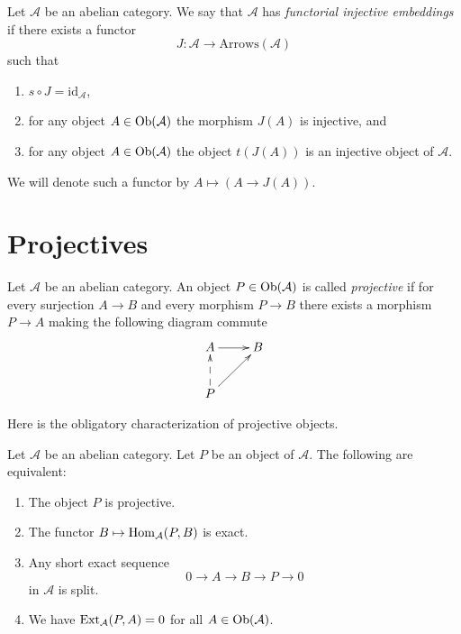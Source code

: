 \begin{definition}
\label{definition-functorial-injective-embedding}
Let $\mathcal{A}$ be an abelian category.
We say that $\mathcal{A}$ has {\it functorial injective embeddings}
if there exists a functor
$$
J : \mathcal{A} \longrightarrow \text{Arrows}(\mathcal{A})
$$
such that
\begin{enumerate}
\item $s \circ J = \text{id}_\mathcal{A}$,
\item for any object $A \in \mathop{\mathrm{Ob}}\nolimits(\mathcal{A})$
the morphism $J(A)$ is injective, and
\item for any object $A \in \mathop{\mathrm{Ob}}\nolimits(\mathcal{A})$
the object $t(J(A))$ is an injective object of $\mathcal{A}$.
\end{enumerate}
We will denote such a functor by
$A \mapsto (A \to J(A))$.
\end{definition}





\section{Projectives}
\label{section-projectives}

\begin{definition}
\label{definition-projective}
Let $\mathcal{A}$ be an abelian category.
An object $P \in \mathop{\mathrm{Ob}}\nolimits(\mathcal{A})$ is
called {\it projective} if for every surjection
$A \rightarrow B$ and every morphism
$P \to B$ there exists a morphism $P \to A$ making
the following diagram commute
$$
\xymatrix{
A \ar[r] & B \\
P \ar@{-->}[u] \ar[ru] &
}
$$
\end{definition}

\noindent
Here is the obligatory characterization of projective objects.

\begin{lemma}
\label{lemma-characterize-projectives}
Let $\mathcal{A}$ be an abelian category.
Let $P$ be an object of $\mathcal{A}$.
The following are equivalent:
\begin{enumerate}
\item The object $P$ is projective.
\item The functor $B \mapsto \mathop{\mathrm{Hom}}\nolimits_\mathcal{A}(P, B)$
is exact.
\item Any short exact sequence
$$
0 \to A \to B \to P \to 0
$$
in $\mathcal{A}$ is split.
\item We have $\mathop{\mathrm{Ext}}\nolimits_\mathcal{A}(P, A) = 0$ for
all $A \in \mathop{\mathrm{Ob}}\nolimits(\mathcal{A})$.
\end{enumerate}
\end{lemma}

